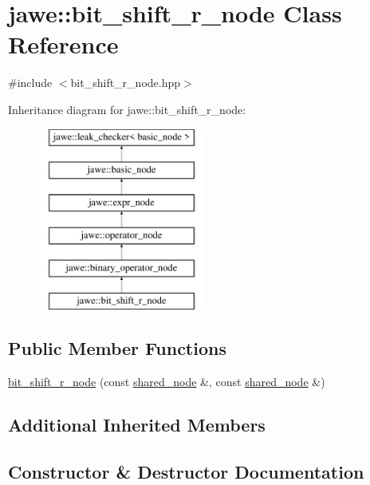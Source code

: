 \hypertarget{classjawe_1_1bit__shift__r__node}{}\section{jawe\+:\+:bit\+\_\+shift\+\_\+r\+\_\+node Class Reference}
\label{classjawe_1_1bit__shift__r__node}


{\ttfamily \#include $<$bit\+\_\+shift\+\_\+r\+\_\+node.\+hpp$>$}

Inheritance diagram for jawe\+:\+:bit\+\_\+shift\+\_\+r\+\_\+node\+:\begin{figure}[H]
\begin{center}
\leavevmode
\includegraphics[height=6.000000cm]{classjawe_1_1bit__shift__r__node}
\end{center}
\end{figure}
\subsection*{Public Member Functions}
\begin{DoxyCompactItemize}
\item 
\hyperlink{classjawe_1_1bit__shift__r__node_a68feccd9fc1c2d51ee325ccd65603a98}{bit\+\_\+shift\+\_\+r\+\_\+node} (const \hyperlink{namespacejawe_a3f307481d921b6cbb50cc8511fc2b544}{shared\+\_\+node} \&, const \hyperlink{namespacejawe_a3f307481d921b6cbb50cc8511fc2b544}{shared\+\_\+node} \&)
\end{DoxyCompactItemize}
\subsection*{Additional Inherited Members}


\subsection{Constructor \& Destructor Documentation}
\mbox{\label{classjawe_1_1bit__shift__r__node_a68feccd9fc1c2d51ee325ccd65603a98}} 
